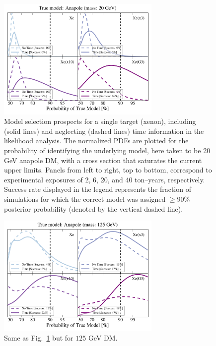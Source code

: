 \documentclass[11pt]{article}
\begin{document}
\begin{figure}
\centering
\includegraphics[width=0.7\textwidth]{plots/PDF_20GeV_Anapole_50sims_Xe_Xe3x_Xe10x_XeG3_GF_TNT.pdf}
\caption{\label{fig:20gev_anapole_XeFull_TNT_GF}
Model selection prospects for a single target (xenon), including (solid lines) and neglecting (dashed lines) time information in the likelihood analysis. The normalized PDFs are plotted for the probability of identifying the underlying model, here taken to be 20 GeV anapole DM, with a cross section that saturates the current upper limits. Panels from left to right, top to bottom, correspond to experimental exposures of 2, 6, 20, and 40 ton--years, respectively. Success rate displayed in the legend represents the fraction of simulations for which the correct model was assigned $ \geq 90\%$ posterior probability (denoted by the vertical dashed line).}

\end{figure}
\begin{figure}
\centering
\includegraphics[width=0.7\textwidth]{plots/PDF_125GeV_Anapole_50sims_Xe_Xe3x_Xe10x_XeG3_GF_TNT.pdf}
\caption{\label{fig:125gev_anapole_XeFull_TNT_GF}
Same as Fig.~\ref{fig:20gev_anapole_XeFull_TNT_GF} but for $125$ GeV DM.}
\end{figure}
\end{document}
